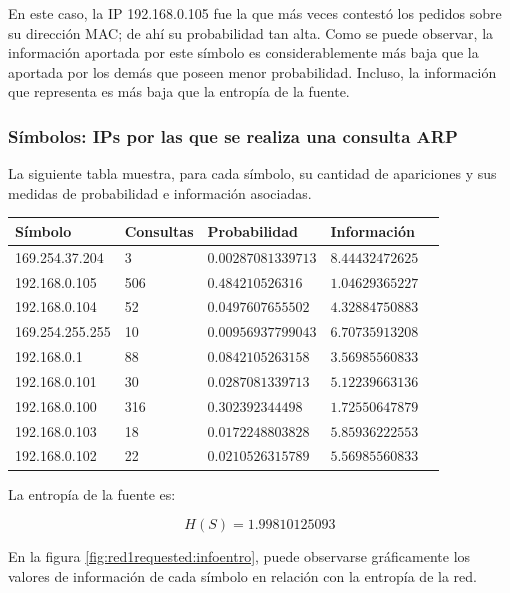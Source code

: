 \documentclass{article}
\begin{document}
En este caso, la IP 192.168.0.105 fue la que más veces contestó los pedidos
sobre su dirección MAC; de ahí su probabilidad tan alta. Como se puede
observar, la información aportada por este símbolo es considerablemente más
baja que la aportada por los demás que poseen menor probabilidad. Incluso, la
información que representa es más baja que la entropía de la fuente.

\subsubsection{Símbolos: IPs por las que se realiza una consulta ARP}
La siguiente tabla muestra, para cada símbolo, su cantidad de apariciones y
sus medidas de probabilidad e información asociadas.

\vskip10pt

\begin{tabular}{|l|l|l|l|l|}
  \hline
  Símbolo & Consultas & Probabilidad & Información \\
  \hline
  169.254.37.204 & 3 & $0.00287081339713$ & $8.44432472625$\\
  \hline
  192.168.0.105 & 506 & $0.484210526316$ & $1.04629365227$\\
  \hline
  192.168.0.104 & 52 & $0.0497607655502$ & $4.32884750883$\\
  \hline
  169.254.255.255 & 10 & $0.00956937799043$ & $6.70735913208$\\
  \hline
  192.168.0.1 & 88 & $0.0842105263158$ & $3.56985560833$\\
  \hline
  192.168.0.101 & 30 & $0.0287081339713$ & $5.12239663136$\\
  \hline
  192.168.0.100 & 316 & $0.302392344498$ & $1.72550647879$\\
  \hline
  192.168.0.103 & 18 & $0.0172248803828$ & $5.85936222553$\\
  \hline
  192.168.0.102 & 22 & $0.0210526315789$ & $5.56985560833$\\
  \hline
\end{tabular}

\vskip10pt

La entropía de la fuente es:

$$H(S) = 1.99810125093$$

En la figura \ref{fig:red1requested:infoentro}, puede observarse gráficamente
los valores de información de cada símbolo en relación con la entropía de la
red.
\end{document}
